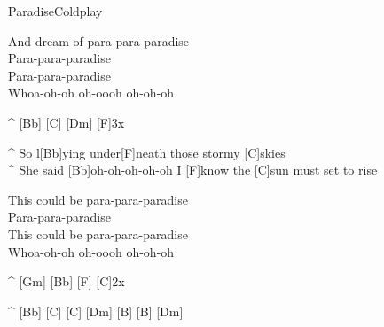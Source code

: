 \begin{song}{Paradise}{Coldplay}
\begin{guitar}
And dream of para-para-paradise\\
Para-para-paradise\\
Para-para-paradise\\
Whoa-oh-oh oh-oooh oh-oh-oh\\
\end{guitar}

\begin{guitar}
^ [Bb] [C] [Dm] [F]\quad 3x\\
\end{guitar}

\begin{guitar}
^ So l[Bb]ying under[F]neath those stormy [C]skies\\
^ She said [Bb]oh-oh-oh-oh-oh I [F]know the [C]sun must set to rise\\
\end{guitar}

\begin{guitar}
This could be para-para-paradise\\
Para-para-paradise\\
This could be para-para-paradise\\
Whoa-oh-oh oh-oooh oh-oh-oh\\
\end{guitar}

\begin{guitar}
^ [Gm] [Bb] [F] [C]\quad 2x\\
\end{guitar}


\begin{guitar}
^ [Bb] [C] [C] [Dm] [B] [B] [Dm]\\
\end{guitar}
\end{song}

